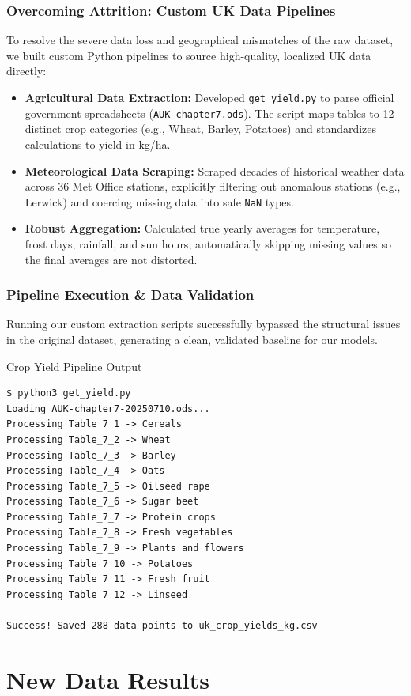 \documentclass[aspectratio=169]{beamer}
\begin{document}
    \begin{frame}
        \frametitle{Overcoming Attrition: Custom UK Data Pipelines}
        To resolve the severe data loss and geographical mismatches of the raw dataset, we built custom Python pipelines to source high-quality, localized UK data directly:
        
        \begin{itemize}
            \item \textbf{Agricultural Data Extraction:} 
            Developed \texttt{get\_yield.py} to parse official government spreadsheets (\texttt{AUK-chapter7.ods}). The script maps tables to 12 distinct crop categories (e.g., Wheat, Barley, Potatoes) and standardizes calculations to yield in kg/ha.
            
            \item \textbf{Meteorological Data Scraping:} 
            Scraped decades of historical weather data across 36 Met Office stations, explicitly filtering out anomalous stations (e.g., Lerwick) and coercing missing data into safe \texttt{NaN} types.
            
            \item \textbf{Robust Aggregation:} 
            Calculated true yearly averages for temperature, frost days, rainfall, and sun hours, automatically skipping missing values so the final averages are not distorted.
        \end{itemize}
    \end{frame}

    \begin{frame}[fragile]
        \frametitle{Pipeline Execution \& Data Validation}
        
        Running our custom extraction scripts successfully bypassed the structural issues in the original dataset, generating a clean, validated baseline for our models.
        
        \begin{exampleblock}{Crop Yield Pipeline Output}
\begin{verbatim}
$ python3 get_yield.py 
Loading AUK-chapter7-20250710.ods...
Processing Table_7_1 -> Cereals
Processing Table_7_2 -> Wheat
Processing Table_7_3 -> Barley
Processing Table_7_4 -> Oats
Processing Table_7_5 -> Oilseed rape
Processing Table_7_6 -> Sugar beet
Processing Table_7_7 -> Protein crops
Processing Table_7_8 -> Fresh vegetables
Processing Table_7_9 -> Plants and flowers
Processing Table_7_10 -> Potatoes
Processing Table_7_11 -> Fresh fruit
Processing Table_7_12 -> Linseed

Success! Saved 288 data points to uk_crop_yields_kg.csv
\end{verbatim}
        \end{exampleblock}
    
    \section{New Data Results}
    
        
    \end{frame}
\end{document}
